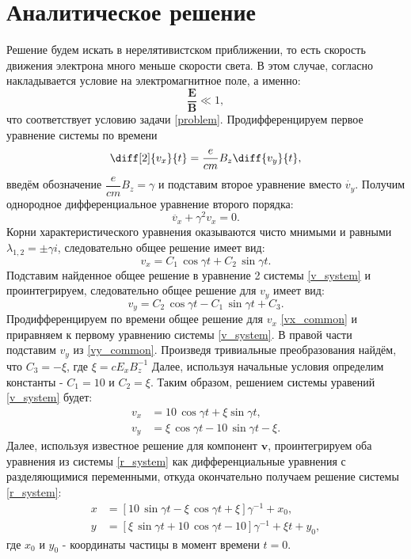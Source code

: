 \documentclass[a4paper]{article}
\begin{document}
\section{Аналитическое решение}\label{Analytic}
Решение будем искать в нерелятивистском приближении, то есть скорость движения электрона много меньше скорости света. В этом случае, согласно \cite{Landau:field, Izmaylov} накладывается условие на электромагнитное поле, а именно:
\begin{equation}
\dfrac{\mathbf{E}}{\mathbf{B}} \ll 1 ,
\end{equation}
что соответствует условию задачи \ref{problem}. Продифференцируем первое уравнение системы по времени
\[
\diff[2]{v_x}{t} =\frac{e}{cm} B_z \diff{v_y}{t},
\]
введём обозначение $\dfrac{e}{cm}B_z = \gamma$ и подставим второе уравнение вместо $\dot{v_y}$. Получим однородное дифференциальное уравнение второго порядка:
\[
\ddot{v_x} + \gamma^2 v_x = 0 .		
\]
Корни характеристического уравнения оказываются чисто мнимыми и равными ${\lambda_{1,2} = \pm \gamma i}$, следовательно общее решение имеет вид:
\begin{equation}\label{vx_common}
v_x = C_1\, \cos{\gamma t} + C_2\, \sin{\gamma t} .
\end{equation}
Подставим найденное общее решение в уравнение 2 системы \eqref{v_system} и проинтегрируем, следовательно общее решение для $v_y$ имеет вид:
\begin{equation}\label{vy_common}
v_y = C_2 \, \cos{\gamma t} - C_1 \, \sin {\gamma t} + C_3 .
\end{equation}
Продифференцируем по времени общее решение для $v_x$ \eqref{vx_common} и приравняем к первому уравнению системы \eqref{v_system}. В правой части подставим $v_y$ из \eqref{vy_common}. Произведя тривиальные преобразования найдём, что $C_3 = -\xi$, где $\xi = cE_xB_z^{-1}$ Далее, используя начальные условия определим константы - $C_1 = 10$ и $C_2 = \xi$. Таким образом, решением системы уравений \eqref{v_system} будет:
\begin{align}\label{analytic_v}
v_x &= 10 \, \cos{\gamma t} + \xi \sin{\gamma t} , \\
v_y &= \xi \, \cos{\gamma t} - 10 \, \sin {\gamma t} - \xi .
\end{align}
Далее, используя известное решение для компонент $\mathbf{v}$, проинтегрируем оба уравнения из системы \eqref{r_system} как дифференциальные уравнения с разделяющимися переменными, откуда окончательно получаем решение системы \eqref{r_system}:
\begin{align}\label{analytic_r}
x &= \left[10 \, \sin{\gamma t} - \xi \, \cos{\gamma t} + \xi\right] \gamma^{-1} + x_0 ,\\
y &= \left[\xi \, \sin{\gamma t} + 10 \, \cos{\gamma t} - 10\right] \gamma^{-1} + \xi t  + y_0 , 
\end{align} 
где $x_0$ и $y_0$ - координаты частицы в момент времени $t=0$.
\newpage
\end{document}
